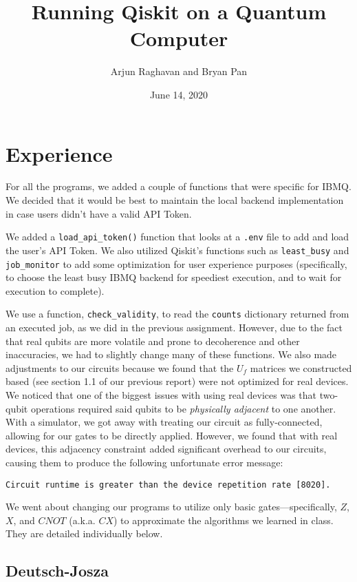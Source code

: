 \documentclass[12pt]{article}
\title{Running Qiskit on a Quantum Computer}
\author{Arjun Raghavan and Bryan Pan}
\date{June 14, 2020}
\begin{document}
\mktitle
\startbody

\section{Experience}
For all the programs, we added a couple of functions that were specific for IBMQ. We decided that it would be best to maintain the local backend implementation in case users didn’t have a valid API Token.

We added a \texttt{load\_api\_token()} function that looks at a \texttt{.env} file to add and load the user’s API Token. We also utilized Qiskit’s functions such as \texttt{least\_busy} and \texttt{job\_monitor} to add some optimization for user experience purposes (specifically, to choose the least busy IBMQ backend for speediest execution, and to wait for execution to complete).

We use a function, \texttt{check\_validity}, to read the \texttt{counts} dictionary returned from an executed job, as we did in the previous assignment.
However, due to the fact that real qubits are more volatile and prone to decoherence and other inaccuracies, we had to slightly change many of these functions.
We also made adjustments to our circuits because we found that the $U_f$ matrices we constructed based (see section 1.1 of our previous report) were not optimized for real devices.
We noticed that one of the biggest issues with using real devices was that two-qubit operations required said qubits to be \textit{physically adjacent} to one another.
With a simulator, we got away with treating our circuit as fully-connected, allowing for our gates to be directly applied.
However, we found that with real devices, this adjacency constraint added significant overhead to our circuits, causing them to produce the following unfortunate error message:
\begin{lstlisting}[numbers=none]
    Circuit runtime is greater than the device repetition rate [8020].
\end{lstlisting}
We went about changing our programs to utilize only basic gates---specifically, $Z$, $X$, and $CNOT$ (a.k.a. $CX$) to approximate the algorithms we learned in class.
They are detailed individually below.

\subsection{Deutsch-Josza}
\end{document}
